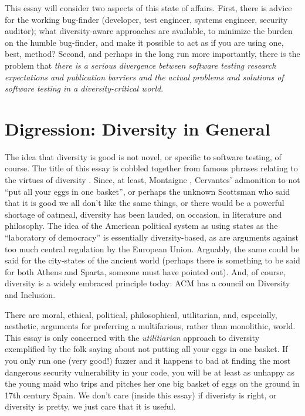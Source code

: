 \documentclass[sigplan,review]{acmart}
\begin{document}
This essay will consider two aspects of this state of affairs.  First,
there is advice for the working bug-finder (developer, test engineer, systems
engineer, security auditor); what diversity-aware approaches are
available, to minimize the burden on the humble bug-finder, and make
it possible to act as if you are using one, best, method?  Second, and
perhaps in the long run 
more importantly, there is the problem that \emph{there is a serious
divergence between software testing research expectations and
publication barriers and the actual problems and solutions of software testing in a
diversity-critical world}.

\section{Digression: Diversity in General}

The idea that diversity is good is not novel, or specific to software
testing, of course.  The title of this essay is cobbled together from
famous phrases relating to the virtues of diversity \cite{chesterton,mao}.  Since, at least,
Montaigne \cite{montaigne}, Cervantes' \cite{cervantes} admonition to not ``put all your eggs in one
basket'', or perhaps the unknown Scottsman who said that it is good we all
don't like the same things, or there would be a powerful shortage of
oatmeal, diversity has been lauded, on occasion, in literature and
philosophy.  The idea of the American political system as using states
as the ``laboratory of democracy'' is essentially diversity-based, as
are arguments against too much central regulation by the European
Union.  Arguably, the same could be said for the city-states of the
ancient world (perhaps there is something to be said for both Athens
and Sparta, someone must have pointed out).  And, of course, diversity
is a widely embraced principle today: ACM has a council on Diversity
and Inclusion.

There are moral, ethical,
political, philosophical, utilitarian, and, especially,
aesthetic, arguments for preferring a multifarious, rather than
monolithic, world.  This essay is only concerned with the \emph{utilitiarian}
approach to diversity exemplified by the folk saying about not putting
all your eggs in one basket.  If you only run one (very good!) fuzzer
and it happens to bad at finding the most dangerous security
vulnerability in your code, you will be at least as unhappy as the young maid
who trips and pitches her one big basket of eggs on the ground in 17th
century Spain.  We don't care (inside this essay) if diveristy is right, or
diversity is pretty, we just care that it is useful.
\end{document}
